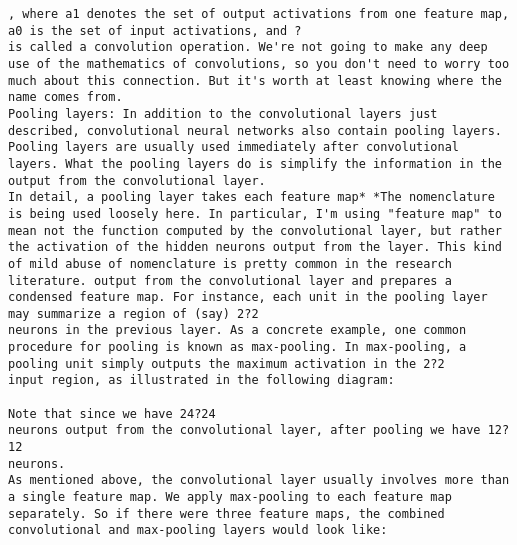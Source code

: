 \begin{lstlisting}
, where a1 denotes the set of output activations from one feature map, a0 is the set of input activations, and ?
is called a convolution operation. We're not going to make any deep use of the mathematics of convolutions, so you don't need to worry too much about this connection. But it's worth at least knowing where the name comes from.
Pooling layers: In addition to the convolutional layers just described, convolutional neural networks also contain pooling layers. Pooling layers are usually used immediately after convolutional layers. What the pooling layers do is simplify the information in the output from the convolutional layer.
In detail, a pooling layer takes each feature map* *The nomenclature is being used loosely here. In particular, I'm using "feature map" to mean not the function computed by the convolutional layer, but rather the activation of the hidden neurons output from the layer. This kind of mild abuse of nomenclature is pretty common in the research literature. output from the convolutional layer and prepares a condensed feature map. For instance, each unit in the pooling layer may summarize a region of (say) 2?2
neurons in the previous layer. As a concrete example, one common procedure for pooling is known as max-pooling. In max-pooling, a pooling unit simply outputs the maximum activation in the 2?2
input region, as illustrated in the following diagram:

Note that since we have 24?24
neurons output from the convolutional layer, after pooling we have 12?12
neurons.
As mentioned above, the convolutional layer usually involves more than a single feature map. We apply max-pooling to each feature map separately. So if there were three feature maps, the combined convolutional and max-pooling layers would look like:


\end{lstlisting}
